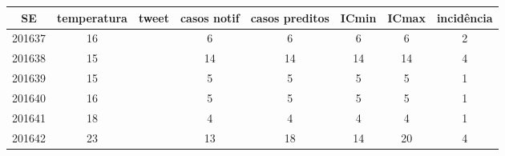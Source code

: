 \begin{tabular}{c|ccccccc}
  \hline
SE & temperatura & tweet & casos notif & casos preditos & ICmin & ICmax & incidência \\ 
  \hline
201637 & 16 &  & 6 & 6 & 6 & 6 & 2 \\ 
  201638 & 15 &  & 14 & 14 & 14 & 14 & 4 \\ 
  201639 & 15 &  & 5 & 5 & 5 & 5 & 1 \\ 
  201640 & 16 &  & 5 & 5 & 5 & 5 & 1 \\ 
  201641 & 18 &  & 4 & 4 & 4 & 4 & 1 \\ 
  201642 & 23 &  & 13 & 18 & 14 & 20 & 4 \\ 
   \hline
\end{tabular}
